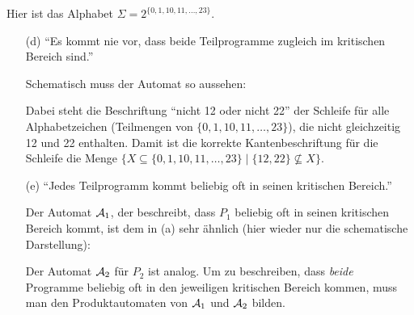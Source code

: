 \documentclass[fontsize=11pt, twoside=false, numbers=autoenddot]{scrbook}
\begin{document}
Hier ist das Alphabet $\Sigma = 2^{\{0,1,10,11,\dots,23\}}$.
%
\begin{itemize}
  \item[(d)]
    "`Es kommt nie vor,
    dass beide Teilprogramme zugleich im kritischen Bereich sind."'

    Schematisch muss der Automat so aussehen:
    \begin{center}
    \end{center}
    Dabei steht die Beschriftung "`nicht 12 oder nicht 22"' der Schleife für alle Alphabet\-zeichen
    (Teilmengen von $\{0,1,10,11,\dots,23\}$), die nicht gleichzeitig 12 und 22 enthalten.
    Damit ist die korrekte Kantenbeschriftung für die Schleife
    die Menge $\{X \subseteq \{0,1,10,11,\dots,23\} \mid \{12,22\} \nsubseteq X\}$.
  \item[(e)]
    "`Jedes Teilprogramm kommt beliebig oft in seinen kritischen Bereich."'
    
    Der Automat $\mathcal{A}_1$, der beschreibt, dass $P_1$ beliebig oft in seinen kritischen Bereich kommt,
    ist dem in (a) sehr ähnlich (hier wieder nur die schematische Darstellung):
    \begin{center}
    \end{center}
    Der Automat $\mathcal{A}_2$ für $P_2$ ist analog.
    Um zu beschreiben, dass \emph{beide} Programme beliebig oft in den
    jeweiligen kritischen Bereich kommen, muss man den Produktautomaten von $\mathcal{A}_1$ und $\mathcal{A}_2$ bilden.
    

\end{itemize}
\end{document}
